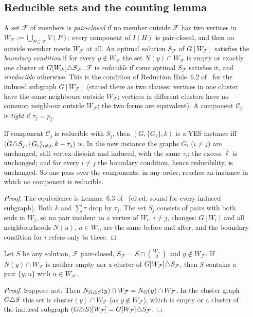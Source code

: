 \subsection{Reducible sets and the counting lemma}
A set $\mathcal F$ of members is \emph{pair-closed} if no member outside $\mathcal F$ has two vertices in $W_{\mathcal F}:=\bigcup_{P\in\mathcal F}V(P)$; every component of $I(H)$ is pair-closed, and then no outside member meets $W_{\mathcal F}$ at all. An optimal solution $S_{\mathcal F}$ of $G[W_{\mathcal F}]$ satisfies the \emph{boundary condition} if for every $y\notin W_{\mathcal F}$ the set $N(y)\cap W_{\mathcal F}$ is empty or exactly one cluster of $G[W_{\mathcal F}]\triangle S_{\mathcal F}$. $\mathcal F$ is \emph{reducible} if some optimal $S_{\mathcal F}$ satisfies it, and \emph{irreducible} otherwise. This is the condition of Reduction Rule~6.2 of~\cite{BFK18} for the induced subgraph $G[W_{\mathcal F}]$ (stated there as two clauses: vertices in one cluster have the same neighbours outside $W_{\mathcal F}$; vertices in different clusters have no common neighbour outside $W_{\mathcal F}$; the two forms are equivalent). A component $\mathcal C_j$ is \emph{tight} if $\tau_j=p_j$.

\begin{lemma}\label{lem:K2}
If component $\mathcal C_j$ is reducible with $S_j$, then $(G,\{G_i\},k)$ is a YES instance iff $(G\triangle S_j,\{G_i\}_{i\ne j},k-\tau_j)$ is. In the new instance the graphs $G_i$ ($i\neq j$) are unchanged, still vertex-disjoint and induced, with the same $\tau_i$; the excess $\bar\ell$ is unchanged; and for every $i\ne j$ the boundary condition, hence reducibility, is unchanged. So one pass over the components, in any order, reaches an instance in which no component is reducible.
\end{lemma}
\begin{proof}
The equivalence is Lemma~6.3 of~\cite{BFK18} (cited; sound for every induced subgraph). Both $k$ and $\sum\tau$ drop by $\tau_j$. The set $S_j$ consists of pairs with both ends in $W_j$, so no pair incident to a vertex of $W_i$, $i\neq j$, changes: $G[W_i]$ and all neighbourhoods $N(u)$, $u\in W_i$, are the same before and after, and the boundary condition for $i$ refers only to these.
\end{proof}

\begin{lemma}\label{lem:D}
Let $S$ be any solution, $\mathcal F$ pair-closed, $S_{\mathcal F}=S\cap\binom{W_{\mathcal F}}2$ and $y\notin W_{\mathcal F}$. If $N(y)\cap W_{\mathcal F}$ is neither empty nor a cluster of $G[W_{\mathcal F}]\triangle S_{\mathcal F}$, then $S$ contains a pair $\{y,u\}$ with $u\in W_{\mathcal F}$.
\end{lemma}
\begin{proof}
Suppose not. Then $N_{G\triangle S}(y)\cap W_{\mathcal F}=N_G(y)\cap W_{\mathcal F}$. In the cluster graph $G\triangle S$ this set is $\mathrm{cluster}(y)\cap W_{\mathcal F}$ (as $y\notin W_{\mathcal F}$), which is empty or a cluster of the induced subgraph $(G\triangle S)[W_{\mathcal F}]=G[W_{\mathcal F}]\triangle S_{\mathcal F}$.
\end{proof}

